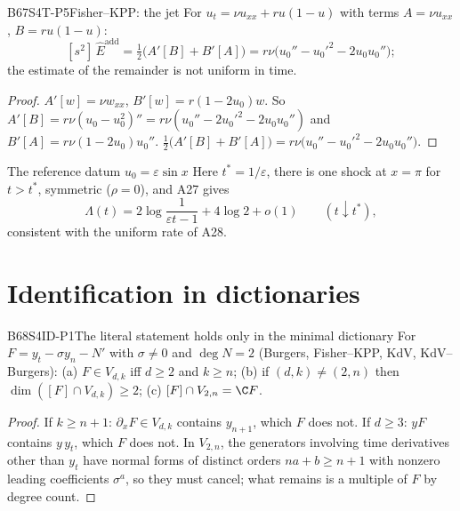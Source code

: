 \begin{dimcard}{B67}{S4T-P5}{Fisher--KPP: the jet}{\proved}{}
For $u_t=\nu u_{xx}+ru(1-u)$ with terms $A=\nu u_{xx}$, $B=ru(1-u)$:
\[
[s^2]\,\hat E^{\mathrm{add}}=\tfrac12\big(A'[B]+B'[A]\big)=r\nu\big(u_0''-u_0'^2-2u_0u_0''\big);
\]
the estimate of the remainder is not uniform in time.
\end{dimcard}
\begin{proof}
$A'[w]=\nu w_{xx}$, $B'[w]=r(1-2u_0)w$. So $A'[B]=r\nu(u_0-u_0^2)''=r\nu(u_0''-2u_0'^2-2u_0u_0'')$ and $B'[A]=r\nu(1-2u_0)u_0''$.
$\tfrac12\big(A'[B]+B'[A]\big)=r\nu\big(u_0''-u_0'^2-2u_0u_0''\big)$.
\end{proof}

\begin{example}{The reference datum $u_0=\varepsilon\sin x$ }
Here $t^*=1/\varepsilon$, there is one shock at $x=\pi$ for $t>t^*$, symmetric ($\rho=0$), and A27 gives
\[
\Lambda(t)=2\log\frac{1}{\varepsilon t-1}+4\log2+o(1)\qquad(t\downarrow t^*),
\]
consistent with the uniform rate of A28.
\end{example}

\section{Identification in dictionaries}

\begin{dimcard}{B68}{S4ID-P1}{The literal statement holds only in the minimal dictionary}{\proved}{}
For $F=y_t-\sigma y_n-N'$ with $\sigma\ne0$ and $\deg N=2$ (Burgers, Fisher--KPP, KdV, KdV--Burgers): (a) $F\in V_{d,k}$ iff $d\ge2$ and $k\ge n$; (b) if $(d,k)\ne(2,n)$ then $\dim([F]\cap V_{d,k})\ge2$; (c) $[F]\cap V_{2,n}=\C F$.
\end{dimcard}
\begin{proof}
If $k\ge n+1$: $\partial_xF\in V_{d,k}$ contains $y_{n+1}$, which $F$ does not. If $d\ge3$: $yF$ contains $y\,y_t$, which $F$ does not.
In $V_{2,n}$, the generators involving time derivatives other than $y_t$ have normal forms of distinct orders $na+b\ge n+1$ with nonzero leading coefficients $\sigma^a$, so they must cancel; what remains is a multiple of $F$ by degree count.
\end{proof}

